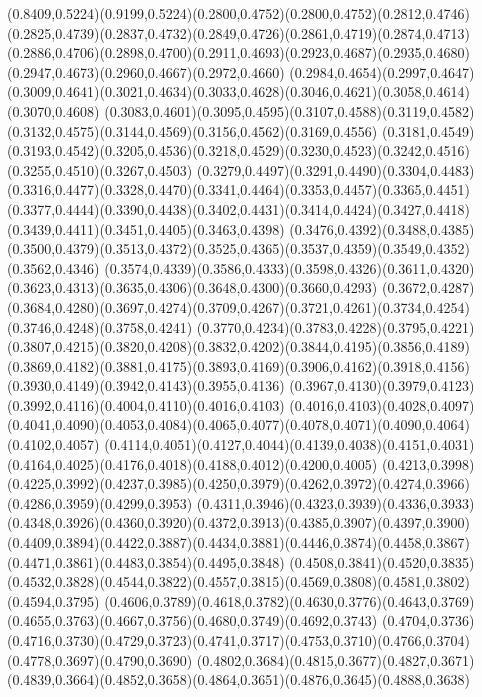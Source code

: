 \PST@Solid(0.8409,0.5224)(0.9199,0.5224)\PST@Solid(0.2800,0.4752)(0.2800,0.4752)(0.2812,0.4746)(0.2825,0.4739)(0.2837,0.4732)(0.2849,0.4726)(0.2861,0.4719)(0.2874,0.4713)
(0.2886,0.4706)(0.2898,0.4700)(0.2911,0.4693)(0.2923,0.4687)(0.2935,0.4680)(0.2947,0.4673)(0.2960,0.4667)(0.2972,0.4660)
(0.2984,0.4654)(0.2997,0.4647)(0.3009,0.4641)(0.3021,0.4634)(0.3033,0.4628)(0.3046,0.4621)(0.3058,0.4614)(0.3070,0.4608)
(0.3083,0.4601)(0.3095,0.4595)(0.3107,0.4588)(0.3119,0.4582)(0.3132,0.4575)(0.3144,0.4569)(0.3156,0.4562)(0.3169,0.4556)
(0.3181,0.4549)(0.3193,0.4542)(0.3205,0.4536)(0.3218,0.4529)(0.3230,0.4523)(0.3242,0.4516)(0.3255,0.4510)(0.3267,0.4503)
(0.3279,0.4497)(0.3291,0.4490)(0.3304,0.4483)(0.3316,0.4477)(0.3328,0.4470)(0.3341,0.4464)(0.3353,0.4457)(0.3365,0.4451)
(0.3377,0.4444)(0.3390,0.4438)(0.3402,0.4431)(0.3414,0.4424)(0.3427,0.4418)(0.3439,0.4411)(0.3451,0.4405)(0.3463,0.4398)
(0.3476,0.4392)(0.3488,0.4385)(0.3500,0.4379)(0.3513,0.4372)(0.3525,0.4365)(0.3537,0.4359)(0.3549,0.4352)(0.3562,0.4346)
(0.3574,0.4339)(0.3586,0.4333)(0.3598,0.4326)(0.3611,0.4320)(0.3623,0.4313)(0.3635,0.4306)(0.3648,0.4300)(0.3660,0.4293)
(0.3672,0.4287)(0.3684,0.4280)(0.3697,0.4274)(0.3709,0.4267)(0.3721,0.4261)(0.3734,0.4254)(0.3746,0.4248)(0.3758,0.4241)
(0.3770,0.4234)(0.3783,0.4228)(0.3795,0.4221)(0.3807,0.4215)(0.3820,0.4208)(0.3832,0.4202)(0.3844,0.4195)(0.3856,0.4189)
(0.3869,0.4182)(0.3881,0.4175)(0.3893,0.4169)(0.3906,0.4162)(0.3918,0.4156)(0.3930,0.4149)(0.3942,0.4143)(0.3955,0.4136)
(0.3967,0.4130)(0.3979,0.4123)(0.3992,0.4116)(0.4004,0.4110)(0.4016,0.4103)
\PST@Solid(0.4016,0.4103)(0.4028,0.4097)(0.4041,0.4090)(0.4053,0.4084)(0.4065,0.4077)(0.4078,0.4071)(0.4090,0.4064)(0.4102,0.4057)
(0.4114,0.4051)(0.4127,0.4044)(0.4139,0.4038)(0.4151,0.4031)(0.4164,0.4025)(0.4176,0.4018)(0.4188,0.4012)(0.4200,0.4005)
(0.4213,0.3998)(0.4225,0.3992)(0.4237,0.3985)(0.4250,0.3979)(0.4262,0.3972)(0.4274,0.3966)(0.4286,0.3959)(0.4299,0.3953)
(0.4311,0.3946)(0.4323,0.3939)(0.4336,0.3933)(0.4348,0.3926)(0.4360,0.3920)(0.4372,0.3913)(0.4385,0.3907)(0.4397,0.3900)
(0.4409,0.3894)(0.4422,0.3887)(0.4434,0.3881)(0.4446,0.3874)(0.4458,0.3867)(0.4471,0.3861)(0.4483,0.3854)(0.4495,0.3848)
(0.4508,0.3841)(0.4520,0.3835)(0.4532,0.3828)(0.4544,0.3822)(0.4557,0.3815)(0.4569,0.3808)(0.4581,0.3802)(0.4594,0.3795)
(0.4606,0.3789)(0.4618,0.3782)(0.4630,0.3776)(0.4643,0.3769)(0.4655,0.3763)(0.4667,0.3756)(0.4680,0.3749)(0.4692,0.3743)
(0.4704,0.3736)(0.4716,0.3730)(0.4729,0.3723)(0.4741,0.3717)(0.4753,0.3710)(0.4766,0.3704)(0.4778,0.3697)(0.4790,0.3690)
(0.4802,0.3684)(0.4815,0.3677)(0.4827,0.3671)(0.4839,0.3664)(0.4852,0.3658)(0.4864,0.3651)(0.4876,0.3645)(0.4888,0.3638)
